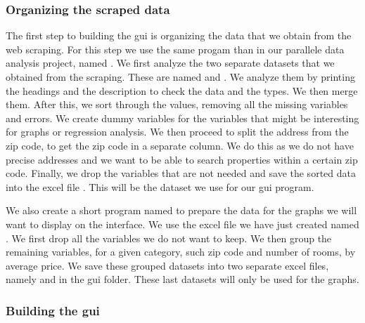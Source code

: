\documentclass[main]{subfiles}
\begin{document}
\subsubsection{Organizing the scraped data}
The first step to building the \ac{gui} is organizing the data that we obtain from the web scraping.
For this step we use the same progam than in our parallele data analysis project, named .
We first analyze the two separate datasets that we obtained from the scraping. 
These are named  and .
We analyze them by printing the headings and the description to check the data and the types.
We then merge them. After this, we sort through the values, removing all the missing variables and errors. 
We create dummy variables for the variables that might be interesting for graphs or regression analysis.
We then proceed to split the address from the zip code, to get the zip code in a separate column. 
We do this as we do not have precise addresses and we want to be able to search properties within a certain zip code. 
Finally, we drop the variables that are not needed and save the sorted data into the excel file .
This will be the dataset we use for our \ac{gui} program. \par
We also create a short program named  to prepare the data for the graphs 
we will want to display on the interface. We use the excel file we have just created named .
We first drop all the variables we do not want to keep. 
We then group the remaining variables, for a given category, such zip code and number of rooms, by average price.
We save these grouped datasets into two separate excel files, namely  and  in the \ac{gui} folder.
These last datasets will only be used for the graphs.\par


\vspace*{5pt}
\subsubsection{Building the \ac{gui}}
\end{document}
